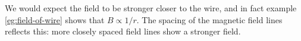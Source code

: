 We would expect the field to be stronger closer to the wire, and
in fact example \ref{eg:field-of-wire} shows that $B\propto 1/r$.
The spacing of the magnetic field lines reflects this:
more closely spaced field lines show a stronger field.
